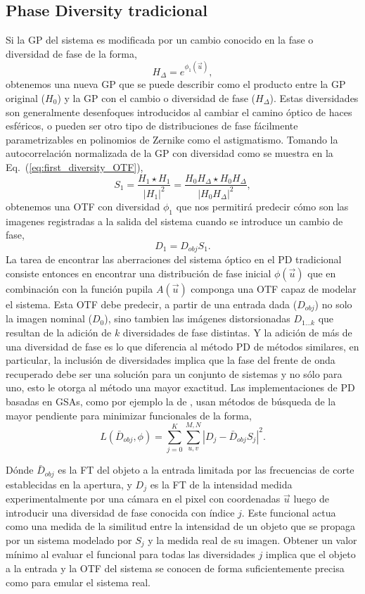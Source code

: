 \subsection{Phase Diversity tradicional}
\label{sec:ChPD_PD_tradicional}
Si la GP del sistema es modificada por un cambio conocido en la fase o
diversidad de fase de la forma,
$$H_{\Delta}=e^{\phi_1(\vec{u})},$$ 
obtenemos una nueva GP que se puede describir como el producto entre
la GP original ($H_{0}$) y la GP con el cambio o diversidad de fase
($H_{\Delta}$). Estas diversidades son generalmente desenfoques
introducidos al cambiar el camino óptico de haces esféricos, o pueden
ser otro tipo de distribuciones de fase fácilmente parametrizables en
polinomios de Zernike como el astigmatismo. Tomando la autocorrelación normalizada de la GP con
diversidad como se muestra en la Eq.~(\ref{eq:first_diversity_OTF}),
\begin{equation}\label{eq:first_diversity_OTF}
S_1 = \frac{H_1\star H_1}{|H_1|^2} = \frac{H_0H_{\Delta} \star H_0H_{\Delta}}{|H_0H_{\Delta}|^2},
\end{equation}
obtenemos una OTF con diversidad $\phi_1$ que nos permitirá predecir cómo son
las imagenes registradas a la salida del sistema cuando se introduce
un cambio de fase, $$D_1 = D_{obj} S_1.$$ 
La tarea de encontrar las aberraciones del sistema óptico en el PD
tradicional consiste entonces en encontrar una distribución de fase
inicial $\phi(\vec{u})$ que en combinación con la función pupila
$A(\vec{u})$ componga una OTF capaz de modelar el
sistema. Esta OTF debe predecir, a partir de una entrada dada 
($D_{obj}$)  no solo la imagen nominal ($D_0$), sino tambien
las imágenes distorsionadas $D_{1...k}$ que resultan de la adición de
$k$ diversidades de fase distintas. Y la adición de más de una
diversidad de fase es lo que diferencia al método PD de métodos
similares, en particular, la inclusión de diversidades implica que la
fase del frente de onda recuperado debe ser una solución para un
conjunto de sistemas y no sólo para uno, esto le otorga al método una
mayor exactitud. Las implementaciones de PD basadas en GSAs, como por
ejemplo la de , usan
métodos de búsqueda de la mayor pendiente para 
minimizar funcionales de la forma,
\begin{equation}\label{eq:metric}
L(\bar{D}_{obj}, \phi)= \sum_{j=0}^{K} \sum_{u,v}^{M,N}  \left |D_{j} - \bar{D}_{obj} S_{j} \right | ^2.
\end{equation}

Dónde $\bar{D}_{obj}$ es la FT del objeto a la entrada limitada por las frecuencias
de corte establecidas en la apertura, y $D_{j}$ es la FT de la intensidad
medida experimentalmente por una cámara en el pixel con coordenadas $\vec{u}$ luego de
introducir una diversidad de fase conocida con índice $j$.      
Este funcional actua como una medida de la similitud entre la
intensidad de un objeto que se propaga por un sistema modelado por
$S_{j}$ y la medida real de su imagen. Obtener un valor mínimo al
evaluar el funcional para todas las diversidades $j$ implica que el objeto a la entrada y la OTF del
sistema se conocen de forma suficientemente precisa como para emular
el sistema real.   

